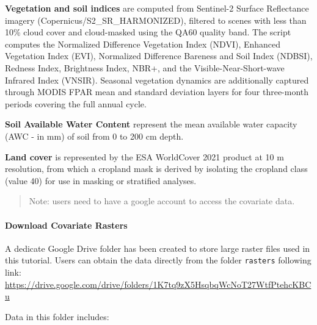 \documentclass[
  10pt,
  b5paper,
  oneside]{book}
\begin{document}
\textbf{Vegetation and soil indices} are computed from Sentinel-2 Surface Reflectance imagery (Copernicus/S2\_SR\_HARMONIZED), filtered to scenes with less than 10\% cloud cover and cloud-masked using the QA60 quality band. The script computes the Normalized Difference Vegetation Index (NDVI), Enhanced Vegetation Index (EVI), Normalized Difference Bareness and Soil Index (NDBSI), Redness Index, Brightness Index, NBR+, and the Visible-Near-Short-wave Infrared Index (VNSIR). Seasonal vegetation dynamics are additionally captured through MODIS FPAR mean and standard deviation layers for four three-month periods covering the full annual cycle.

\textbf{Soil Available Water Content} represent the mean available water capacity (AWC - in mm) of soil from 0 to 200 cm depth.

\textbf{Land cover} is represented by the ESA WorldCover 2021 product at 10 m resolution, from which a cropland mask is derived by isolating the cropland class (value 40) for use in masking or stratified analyses.

\begin{quote}
Note: users need to have a google account to access the covariate data.
\end{quote}

\paragraph*{Download Covariate Rasters}\label{download-covariate-rasters}

A dedicate Google Drive folder has been created to store large raster files used in this tutorial. Users can obtain the data directly from the folder \texttt{rasters} following link:
\url{https://drive.google.com/drive/folders/1K7tq9zX5HsqbqWcNoT27WtfPtehcKBCu}

Data in this folder includes:
\end{document}
